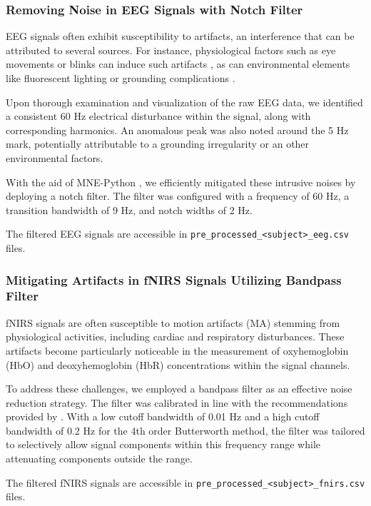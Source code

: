 \subsubsection{Removing Noise in EEG Signals with Notch Filter}

EEG signals often exhibit susceptibility to artifacts, an interference that can be attributed to several sources. For instance, physiological factors such as eye movements or blinks can induce such artifacts \cite{10.3389/fnhum.2012.00278}, as can environmental elements like fluorescent lighting or grounding complications \cite{Kaya21}.

Upon thorough examination and visualization of the raw EEG data, we identified a consistent 60 Hz electrical disturbance within the signal, along with corresponding harmonics. An anomalous peak was also noted around the 5 Hz mark, potentially attributable to a grounding irregularity or an other environmental factors.

With the aid of MNE-Python \cite{GramfortEtAl2013a}, we efficiently mitigated these intrusive noises by deploying a notch filter. The filter was configured with a frequency of 60 Hz, a transition bandwidth of 9 Hz, and notch widths of 2 Hz.

The filtered EEG signals are accessible in \texttt{pre\_processed\_<subject>\_eeg.csv} files.

\subsubsection{Mitigating Artifacts in fNIRS Signals Utilizing Bandpass Filter}

fNIRS signals are often susceptible to motion artifacts (MA) stemming from physiological activities, including cardiac and respiratory disturbances. These artifacts become particularly noticeable in the measurement of oxyhemoglobin (HbO) and deoxyhemoglobin (HbR) concentrations within the signal channels.

To address these challenges, we employed a bandpass filter as an effective noise reduction strategy. The filter was calibrated in line with the recommendations provided by \cite{Koenraadt2014}. With a low cutoff bandwidth of 0.01 Hz and a high cutoff bandwidth of 0.2 Hz for the 4th order Butterworth method, the filter was tailored to selectively allow signal components within this frequency range while attenuating components outside the range.

The filtered fNIRS signals are accessible in
\texttt{pre\_processed\_<subject>\_fnirs.csv} files.

